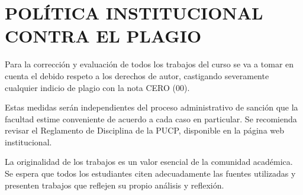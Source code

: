 \documentclass[12pt,a4paper]{article}
\begin{document}
\section{POLÍTICA INSTITUCIONAL CONTRA EL PLAGIO}

\begin{tcolorbox}[colback=pucpRojo!5,colframe=pucpRojo,title=\textbf{Integridad Académica}]
Para la corrección y evaluación de todos los trabajos del curso se va a tomar en cuenta el debido respeto a los derechos de autor, castigando severamente cualquier indicio de plagio con la nota CERO (00).

Estas medidas serán independientes del proceso administrativo de sanción que la facultad estime conveniente de acuerdo a cada caso en particular. Se recomienda revisar el Reglamento de Disciplina de la PUCP, disponible en la página web institucional.

La originalidad de los trabajos es un valor esencial de la comunidad académica. Se espera que todos los estudiantes citen adecuadamente las fuentes utilizadas y presenten trabajos que reflejen su propio análisis y reflexión.
\end{tcolorbox}

\begin{center}
\end{center}
\end{document}

